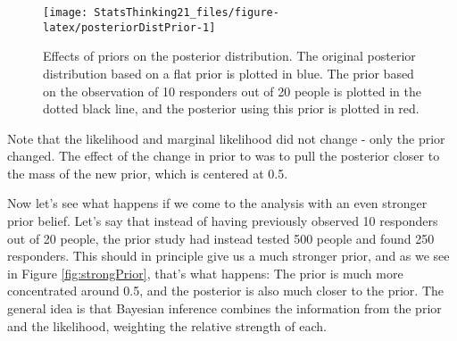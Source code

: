 \documentclass[]{book}
\newenvironment{Shaded}{\begin{snugshade}}{\end{snugshade}}
\newcommand{\KeywordTok}[1]{\textcolor[rgb]{0.13,0.29,0.53}{\textbf{#1}}}
\newcommand{\DataTypeTok}[1]{\textcolor[rgb]{0.13,0.29,0.53}{#1}}
\newcommand{\DecValTok}[1]{\textcolor[rgb]{0.00,0.00,0.81}{#1}}
\newcommand{\StringTok}[1]{\textcolor[rgb]{0.31,0.60,0.02}{#1}}
\newcommand{\CommentTok}[1]{\textcolor[rgb]{0.56,0.35,0.01}{\textit{#1}}}
\newcommand{\OperatorTok}[1]{\textcolor[rgb]{0.81,0.36,0.00}{\textbf{#1}}}
\newcommand{\NormalTok}[1]{#1}
\theoremstyle{definition}
\theoremstyle{definition}
\theoremstyle{definition}
\theoremstyle{remark}
\begin{document}
\begin{figure}
\texttt{[image: StatsThinking21\_files/figure-latex/posteriorDistPrior-1]} \caption{Effects of priors on the posterior distribution.  The original posterior distribution based on a flat prior is plotted in blue. The prior based on the observation of 10 responders out of 20 people is plotted in the dotted black line, and the posterior using this prior is plotted in red.}\label{fig:posteriorDistPrior}
\end{figure}

Note that the likelihood and marginal likelihood did not change - only
the prior changed. The effect of the change in prior to was to pull the
posterior closer to the mass of the new prior, which is centered at 0.5.

Now let's see what happens if we come to the analysis with an even
stronger prior belief. Let's say that instead of having previously
observed 10 responders out of 20 people, the prior study had instead
tested 500 people and found 250 responders. This should in principle
give us a much stronger prior, and as we see in Figure
\ref{fig:strongPrior}, that's what happens: The prior is much more
concentrated around 0.5, and the posterior is also much closer to the
prior. The general idea is that Bayesian inference combines the
information from the prior and the likelihood, weighting the relative
strength of each.

\begin{Shaded}
\end{Shaded}
\end{document}
